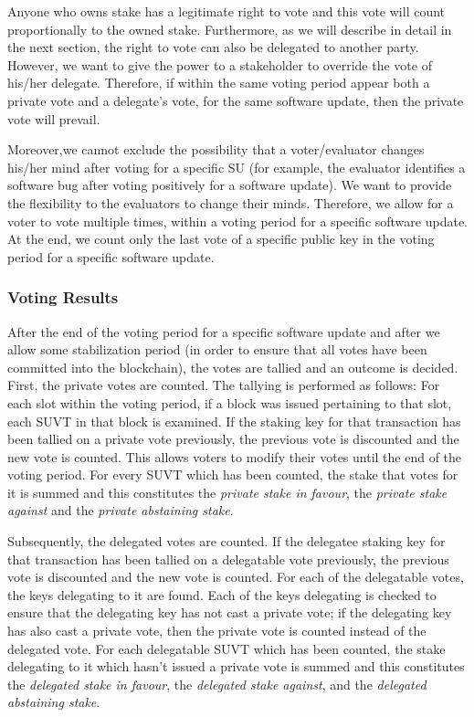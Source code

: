 Anyone who owns stake has a legitimate right to vote and this vote will count proportionally to the owned stake. Furthermore, as we will describe in detail in the next section, the right to vote can also be delegated to another party. However, we want to give the power to a stakeholder to override the vote of his/her delegate. Therefore, if within the same voting period appear both a private vote and a delegate's vote, for the same software update, then the private vote will prevail.

Moreover,we cannot exclude the possibility that a voter/evaluator changes his/her mind after voting for a specific SU (for example, the evaluator identifies a software bug after voting positively for a software update). We want to provide the flexibility to the evaluators to change their minds. Therefore, we allow for a voter to vote multiple times, within a voting period for a specific software update. At the end, we count only the last vote of a specific public key in the voting period for a specific software update.

\subsubsection{Voting Results}
After the end of the voting period for a specific software update and after we allow some stabilization period (in order to ensure that all votes have been committed into the blockchain), the votes are tallied and an outcome is decided. First, the private votes are counted. The tallying is performed as follows: For each slot within the voting period, if a block was issued pertaining to that slot, each SUVT in that block is examined. If the staking key for that transaction has been tallied on a private vote previously, the previous vote is discounted and the new vote is counted. This allows voters to modify their votes until the end of the voting period. For every SUVT which has been counted, the stake that votes for it is summed and this constitutes the \emph{private stake in favour}, the \emph{private stake against} and the \emph{private abstaining stake}. 

Subsequently, the delegated votes are counted. %
If the delegatee staking key for that transaction has been tallied on a delegatable vote previously, the previous vote is discounted and the new vote is counted. For each of the delegatable votes, the keys delegating to it are found. Each of the keys delegating is checked to ensure that the delegating key has not cast a private vote; if the delegating key has also cast a private vote, then the private vote is counted instead of the delegated vote. For each delegatable SUVT which has been counted, the stake delegating to it which hasn't issued a private vote is summed and this constitutes the \emph{delegated stake in favour}, the \emph{delegated stake against}, and the \emph{delegated abstaining stake}.

